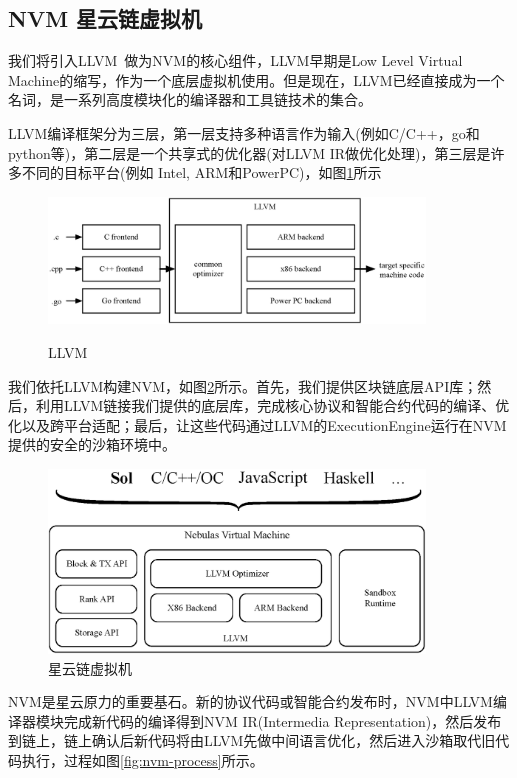 \subsection{NVM 星云链虚拟机}
\label{sec:nvm}

我们将引入LLVM~\cite{llvm}做为NVM的核心组件，LLVM早期是Low Level Virtual Machine的缩写，作为一个底层虚拟机使用。但是现在，LLVM已经直接成为一个名词，是一系列高度模块化的编译器和工具链技术的集合。

LLVM编译框架分为三层，第一层支持多种语言作为输入(例如C/C++，go和python等)，第二层是一个共享式的优化器(对LLVM IR做优化处理)，第三层是许多不同的目标平台(例如 Intel, ARM和PowerPC)，如图\ref{fig:llvm}所示

\begin{figure}[h]
\centering
\includegraphics[width=10cm]{./figs/llvm}
\label{fig:llvm}
\caption{LLVM}
\end{figure}

我们依托LLVM构建NVM，如图\ref{fig:nvm}所示。首先，我们提供区块链底层API库；然后，利用LLVM链接我们提供的底层库，完成核心协议和智能合约代码的编译、优化以及跨平台适配；最后，让这些代码通过LLVM的ExecutionEngine运行在NVM提供的安全的沙箱环境中。

\begin{figure}[h]
\centering
\includegraphics[width=10cm]{./figs/nvm}
\caption{星云链虚拟机}
\label{fig:nvm}
\end{figure}

NVM是星云原力的重要基石。新的协议代码或智能合约发布时，NVM中LLVM编译器模块完成新代码的编译得到NVM IR(Intermedia Representation)，然后发布到链上，链上确认后新代码将由LLVM先做中间语言优化，然后进入沙箱取代旧代码执行，过程如图\ref{fig:nvm-process}所示。 \\

